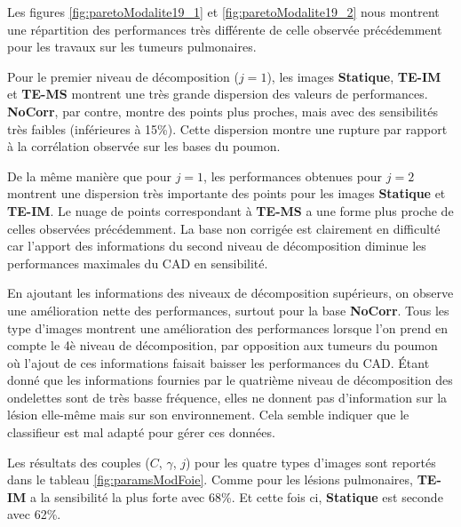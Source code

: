 Les figures \ref{fig:paretoModalite19_1} et \ref{fig:paretoModalite19_2} nous montrent une répartition des performances très différente de celle observée précédemment pour les travaux sur les tumeurs pulmonaires. 

Pour le premier niveau de décomposition ($j=1$), les images \textbf{Statique}, \textbf{TE-IM} et \textbf{TE-MS} montrent une très grande dispersion des valeurs de performances. \textbf{NoCorr}, par contre, montre des points plus proches, mais avec des sensibilités très faibles (inférieures à 15\%). Cette dispersion montre une rupture par rapport à la corrélation observée sur les bases du poumon.

De la même manière que pour $j=1$, les performances obtenues pour $j=2$ montrent une dispersion très importante des points pour les images \textbf{Statique} et \textbf{TE-IM}. Le nuage de points correspondant à \textbf{TE-MS} a une forme plus proche de celles observées précédemment. La base non corrigée est clairement en difficulté car l'apport des informations du second niveau de décomposition diminue les performances maximales du CAD en sensibilité.

En ajoutant les informations des niveaux de décomposition supérieurs, on observe une amélioration nette des performances, surtout pour la base \textbf{NoCorr}. Tous les type d'images montrent une amélioration des performances lorsque l'on  prend en compte le 4è niveau de décomposition, par opposition aux tumeurs du poumon où l'ajout de ces informations faisait baisser les performances du CAD. \'Etant donné que les informations fournies par le quatrième niveau de décomposition des ondelettes sont de très basse fréquence, elles ne donnent pas d'information sur la lésion elle-même mais sur son environnement. Cela semble indiquer que le classifieur est mal adapté pour gérer ces données.


Les résultats des couples ($C$, $\gamma$, $j$) pour les quatre types d'images sont reportés dans le tableau \ref{fig:paramsModFoie}. Comme pour les lésions pulmonaires, \textbf{TE-IM} a la sensibilité la plus forte avec 68\%. Et cette fois ci, \textbf{Statique} est seconde avec 62\%.


